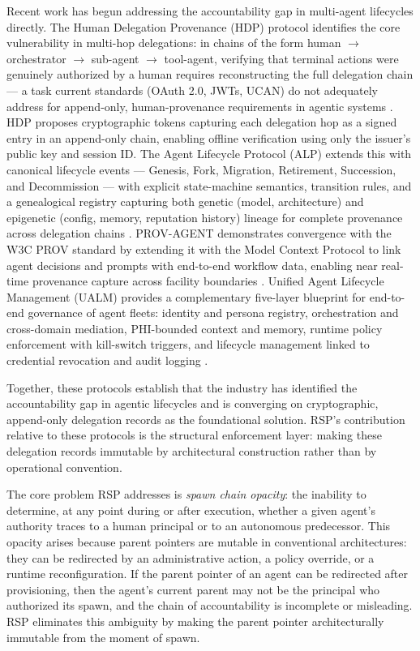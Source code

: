 \documentclass[12pt]{article}
\begin{document}
Recent work has begun addressing the accountability gap in multi-agent lifecycles directly. The Human Delegation Provenance (HDP) protocol identifies the core vulnerability in multi-hop delegations: in chains of the form human $\rightarrow$ orchestrator $\rightarrow$ sub-agent $\rightarrow$ tool-agent, verifying that terminal actions were genuinely authorized by a human requires reconstructing the full delegation chain --- a task current standards (OAuth 2.0, JWTs, UCAN) do not adequately address for append-only, human-provenance requirements in agentic systems \cite{hdp-draft,hdp-draft-2}. HDP proposes cryptographic tokens capturing each delegation hop as a signed entry in an append-only chain, enabling offline verification using only the issuer's public key and session ID. The Agent Lifecycle Protocol (ALP) extends this with canonical lifecycle events --- Genesis, Fork, Migration, Retirement, Succession, and Decommission --- with explicit state-machine semantics, transition rules, and a genealogical registry capturing both genetic (model, architecture) and epigenetic (config, memory, reputation history) lineage for complete provenance across delegation chains \cite{alp2025}. PROV-AGENT demonstrates convergence with the W3C PROV standard by extending it with the Model Context Protocol to link agent decisions and prompts with end-to-end workflow data, enabling near real-time provenance capture across facility boundaries \cite{prov-agent2025}. Unified Agent Lifecycle Management (UALM) provides a complementary five-layer blueprint for end-to-end governance of agent fleets: identity and persona registry, orchestration and cross-domain mediation, PHI-bounded context and memory, runtime policy enforcement with kill-switch triggers, and lifecycle management linked to credential revocation and audit logging \cite{ualm2025}.

Together, these protocols establish that the industry has identified the accountability gap in agentic lifecycles and is converging on cryptographic, append-only delegation records as the foundational solution. RSP's contribution relative to these protocols is the structural enforcement layer: making these delegation records immutable by architectural construction rather than by operational convention.

The core problem RSP addresses is \emph{spawn chain opacity}: the inability to determine, at any point during or after execution, whether a given agent's authority traces to a human principal or to an autonomous predecessor. This opacity arises because parent pointers are mutable in conventional architectures: they can be redirected by an administrative action, a policy override, or a runtime reconfiguration. If the parent pointer of an agent can be redirected after provisioning, then the agent's current parent may not be the principal who authorized its spawn, and the chain of accountability is incomplete or misleading. RSP eliminates this ambiguity by making the parent pointer architecturally immutable from the moment of spawn.
\end{document}
